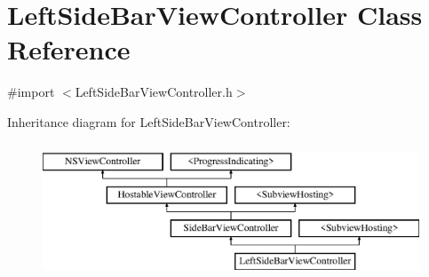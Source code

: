 \hypertarget{interface_left_side_bar_view_controller}{\section{Left\-Side\-Bar\-View\-Controller Class Reference}
\label{interface_left_side_bar_view_controller}
}


{\ttfamily \#import $<$Left\-Side\-Bar\-View\-Controller.\-h$>$}

Inheritance diagram for Left\-Side\-Bar\-View\-Controller\-:\begin{figure}[H]
\begin{center}
\leavevmode
\includegraphics[height=4.000000cm]{interface_left_side_bar_view_controller}
\end{center}
\end{figure}
